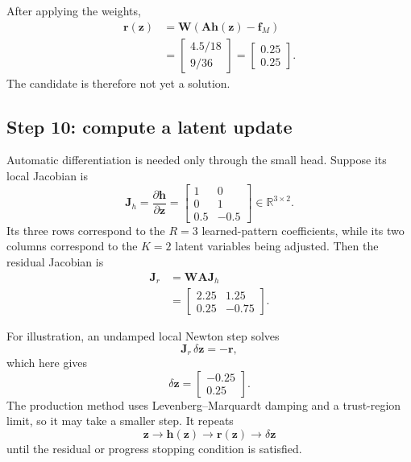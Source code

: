\documentclass[11pt]{article}
\newcommand{\mat}[1]{\mathbf{#1}}
\newcommand{\vect}[1]{\mathbf{#1}}
\newcommand{\R}{\mathbb{R}}
\begin{document}
After applying the weights,
\begin{align}
  \vect{r}(\vect{z})
  &=\mat{W}\left(
      \mat{A}\vect{h}(\vect{z})-\vect{f}_M
    \right)\\
  &=\begin{bmatrix}4.5/18\\9/36\end{bmatrix}
   =\begin{bmatrix}0.25\\0.25\end{bmatrix}.
\end{align}
The candidate is therefore not yet a solution.

\subsection{Step 10: compute a latent update}

Automatic differentiation is needed only through the small head.  Suppose its
local Jacobian is
\begin{equation}
  \mat{J}_h
  =\frac{\partial\vect{h}}{\partial\vect{z}}
  =\begin{bmatrix}
      1&0\\
      0&1\\
      0.5&-0.5
    \end{bmatrix}
  \in\R^{3\times2}.
\end{equation}
Its three rows correspond to the $R=3$ learned-pattern coefficients, while its
two columns correspond to the $K=2$ latent variables being adjusted.
Then the residual Jacobian is
\begin{align}
  \mat{J}_r
  &=\mat{W}\mat{A}\mat{J}_h\\
  &=\begin{bmatrix}
      2.25&1.25\\
      0.25&-0.75
    \end{bmatrix}.
\end{align}

For illustration, an undamped local Newton step solves
\begin{equation}
  \mat{J}_r\,\delta\vect{z}=-\vect{r},
\end{equation}
which here gives
\begin{equation}
  \delta\vect{z}=\begin{bmatrix}-0.25\\0.25\end{bmatrix}.
\end{equation}
The production method uses Levenberg--Marquardt damping and a trust-region
limit, so it may take a smaller step.  It repeats
\begin{equation}
  \vect{z}
  \longrightarrow \vect{h}(\vect{z})
  \longrightarrow \vect{r}(\vect{z})
  \longrightarrow \delta\vect{z}
\end{equation}
until the residual or progress stopping condition is satisfied.
\end{document}
